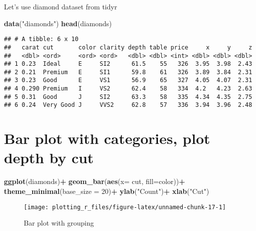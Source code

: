 \documentclass[
]{book}
\newenvironment{Shaded}{\begin{snugshade}}{\end{snugshade}}
\newcommand{\DataTypeTok}[1]{\textcolor[rgb]{0.13,0.29,0.53}{#1}}
\newcommand{\DecValTok}[1]{\textcolor[rgb]{0.00,0.00,0.81}{#1}}
\newcommand{\KeywordTok}[1]{\textcolor[rgb]{0.13,0.29,0.53}{\textbf{#1}}}
\newcommand{\NormalTok}[1]{#1}
\newcommand{\OperatorTok}[1]{\textcolor[rgb]{0.81,0.36,0.00}{\textbf{#1}}}
\newcommand{\StringTok}[1]{\textcolor[rgb]{0.31,0.60,0.02}{#1}}
\begin{document}
Let's use diamond dataset from tidyr

\begin{Shaded}
\begin{Highlighting}[]
\KeywordTok{data}\NormalTok{(}\StringTok{"diamonds"}\NormalTok{)}
\KeywordTok{head}\NormalTok{(diamonds)}
\end{Highlighting}
\end{Shaded}

\begin{verbatim}
## # A tibble: 6 x 10
##   carat cut       color clarity depth table price     x     y     z
##   <dbl> <ord>     <ord> <ord>   <dbl> <dbl> <int> <dbl> <dbl> <dbl>
## 1 0.23  Ideal     E     SI2      61.5    55   326  3.95  3.98  2.43
## 2 0.21  Premium   E     SI1      59.8    61   326  3.89  3.84  2.31
## 3 0.23  Good      E     VS1      56.9    65   327  4.05  4.07  2.31
## 4 0.290 Premium   I     VS2      62.4    58   334  4.2   4.23  2.63
## 5 0.31  Good      J     SI2      63.3    58   335  4.34  4.35  2.75
## 6 0.24  Very Good J     VVS2     62.8    57   336  3.94  3.96  2.48
\end{verbatim}

\hypertarget{bar-plot-with-categories-plot-depth-by-cut}{%
\section{Bar plot with categories, plot depth by cut}\label{bar-plot-with-categories-plot-depth-by-cut}}

\begin{Shaded}
\begin{Highlighting}[]
\KeywordTok{ggplot}\NormalTok{(diamonds)}\OperatorTok{+}
\StringTok{ }\KeywordTok{geom_bar}\NormalTok{(}\KeywordTok{aes}\NormalTok{(}\DataTypeTok{x=}\NormalTok{ cut, }\DataTypeTok{fill=}\NormalTok{color))}\OperatorTok{+}
\StringTok{  }\KeywordTok{theme_minimal}\NormalTok{(}\DataTypeTok{base_size =} \DecValTok{20}\NormalTok{)}\OperatorTok{+}
\StringTok{  }\KeywordTok{ylab}\NormalTok{(}\StringTok{"Count"}\NormalTok{)}\OperatorTok{+}\StringTok{ }\KeywordTok{xlab}\NormalTok{(}\StringTok{"Cut"}\NormalTok{)}
\end{Highlighting}
\end{Shaded}

\begin{figure}

{\centering \texttt{[image: plotting\_r\_files/figure-latex/unnamed-chunk-17-1]} 

}

\caption{Bar plot with grouping}\label{fig:unnamed-chunk-17}
\end{figure}
\end{document}
